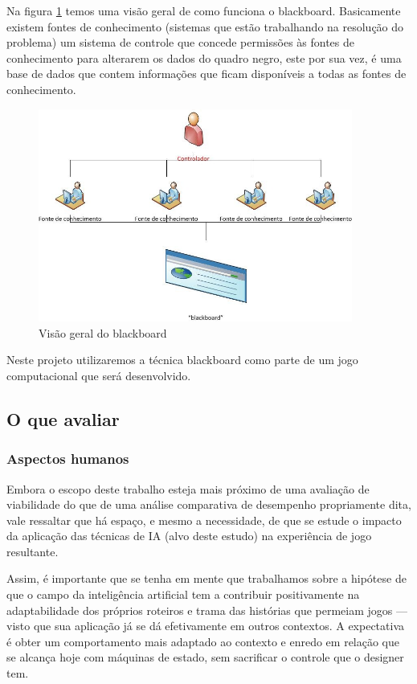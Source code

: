 Na figura \ref{blackboard} temos uma visão geral de como funciona o blackboard. Basicamente existem fontes de conhecimento (sistemas que estão trabalhando na resolução do problema) um sistema de controle que concede permissões às fontes de conhecimento para alterarem os dados do quadro negro, este por sua vez, é uma base de dados que contem informações que ficam disponíveis a todas as fontes de conhecimento.

\begin{figure}
\centering
\includegraphics [height=7cm]{figuras/visao_geral_blackboard.jpg}
\caption{Visão geral do blackboard}
\label{blackboard}
\end{figure}
	
Neste projeto utilizaremos a técnica blackboard como parte de um jogo computacional que será desenvolvido.


\subsection{O que avaliar}

\subsubsection{Aspectos humanos} 

Embora o escopo deste trabalho esteja mais próximo de uma avaliação de viabilidade do que de uma análise comparativa de desempenho propriamente dita, vale ressaltar que há espaço, e mesmo a necessidade, de que se estude o impacto da aplicação das técnicas de IA (alvo deste estudo) na experiência de jogo resultante.

Assim, é importante que se tenha em mente que trabalhamos sobre a hipótese de que o campo da inteligência artificial tem a contribuir positivamente na adaptabilidade dos próprios roteiros e trama das histórias que permeiam jogos --- visto que sua aplicação já se dá efetivamente em outros contextos. A expectativa é obter um comportamento mais adaptado ao contexto e enredo em relação que se alcança hoje com máquinas de estado, sem sacrificar o controle que o designer tem.

